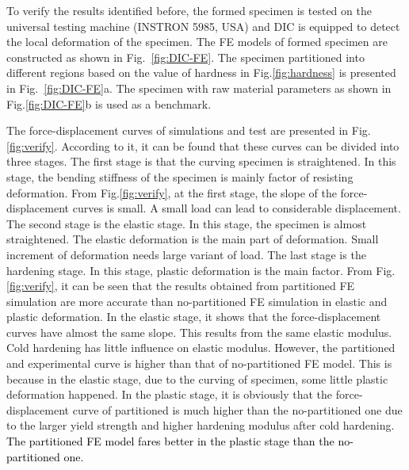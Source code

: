 \documentclass[review]{elsarticle}
\begin{document}
To verify the results identified before, the formed specimen is tested on the universal testing machine (INSTRON 5985, USA) and DIC is equipped to detect the local deformation of the specimen. The FE models of formed specimen are constructed as shown in Fig.~\ref{fig:DIC-FE}. The specimen partitioned into different regions based on the value of hardness in Fig.\ref{fig:hardness} is presented in Fig.~\ref{fig:DIC-FE}a. The specimen with raw material parameters as shown in Fig.\ref{fig:DIC-FE}b is used as a benchmark. 

The force-displacement curves of simulations and test are presented in Fig.\ref{fig:verify}. According to it, it can be found that these curves can be divided into three stages. The first stage is that the curving specimen is straightened. In this stage, the bending stiffness of the specimen is mainly factor of resisting deformation. From Fig.\ref{fig:verify}, at the first stage, the slope of the force-displacement curves is small. A small load can lead to considerable displacement. The second stage is the elastic stage. In this stage, the specimen is almost straightened. The elastic deformation is the main part of deformation. Small increment of deformation needs large variant of load. The last stage is the hardening stage. In this stage, plastic deformation is the main factor. From Fig.\ref{fig:verify}, it can be seen that the results obtained from partitioned FE simulation are more accurate than no-partitioned FE simulation in elastic and plastic deformation. In the elastic stage, it shows that the force-displacement curves have almost the same slope. This results from the same elastic modulus. Cold hardening has little influence on elastic modulus. However, the partitioned and experimental curve is higher than that of no-partitioned FE model. This is because in the elastic stage, due to the curving of specimen, some little plastic deformation happened. In the plastic stage, it is obviously that the force-displacement curve of partitioned is much higher than the no-partitioned one due to the larger yield strength and higher hardening modulus after cold hardening. \textcolor{black}{The partitioned FE model fares better in the plastic stage than the no-partitioned one.} 
\end{document}
